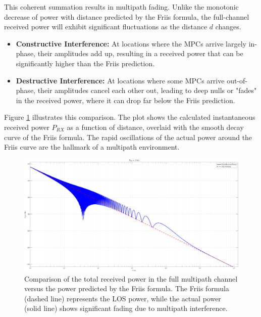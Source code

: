 This coherent summation results in multipath fading. Unlike the monotonic decrease of power with distance predicted by the Friis formula, the full-channel received power will exhibit significant fluctuations as the distance $d$ changes.
\begin{itemize}
	\item \textbf{Constructive Interference:} At locations where the MPCs arrive largely in-phase, their amplitudes add up, resulting in a received power that can be significantly higher than the Friis prediction.
	\item \textbf{Destructive Interference:} At locations where some MPCs arrive out-of-phase, their amplitudes cancel each other out, leading to deep nulls or "fades" in the received power, where it can drop far below the Friis prediction.
\end{itemize}
Figure \ref{fig:prx_vs_friis} illustrates this comparison. The plot shows the calculated instantaneous received power $P_{RX}$ as a function of distance, overlaid with the smooth decay curve of the Friis formula. The rapid oscillations of the actual power around the Friis curve are the hallmark of a multipath environment.

\begin{figure}[h!]
	\centering
	\includegraphics[width=0.9\linewidth]{content/4-images/prx_vs_friis_placeholder.png} %
	\caption{Comparison of the total received power in the full multipath channel versus the power predicted by the Friis formula. The Friis formula (dashed line) represents the LOS power, while the actual power (solid line) shows significant fading due to multipath interference.}
	\label{fig:prx_vs_friis}
\end{figure}

